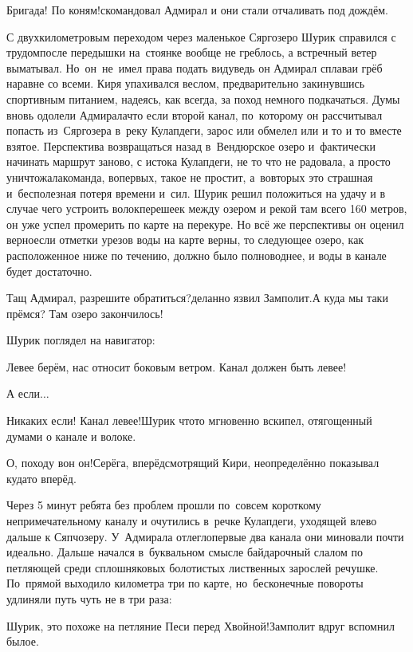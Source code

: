 \diagdash Бригада! По коням!\mdash скомандовал Адмирал и они стали отчаливать под дождём.

С двухкилометровым переходом через маленькое Сяргозеро Шурик справился с трудом\mdash после передышки на~стоянке вообще не греблось, а встречный ветер выматывал. Но~он~не~имел права подать виду\mdash ведь он Адмирал сплава\mdash и грёб наравне со всеми. Киря упахивался веслом, предварительно закинувшись спортивным питанием, надеясь, как всегда, за поход немного подкачаться. Думы вновь одолели Адмирала\mdash что если второй канал, по~которому он рассчитывал попасть из~Сяргозера в~реку Кулапдеги, зарос или обмелел или и то и то вместе взятое. Перспектива возвращаться назад в~Вендюрское озеро и~фактически начинать маршрут заново, с истока Кулапдеги, не то что не радовала, а просто уничтожала\mdash команда, во\sdash первых, такое не простит, а~во\sdash вторых это страшная и~бесполезная потеря времени и~сил. Шурик решил положиться на удачу и в случае чего устроить волок\mdash перешеек между озером и рекой там всего 160 метров, он уже успел промерить по карте на перекуре. Но всё же перспективы он оценил верно\mdash если отметки урезов воды на карте верны, то следующее озеро, как расположенное ниже по течению, должно было полноводнее, и воды в канале будет достаточно.

\diagdash Тащ Адмирал, разрешите обратиться?\mdash деланно язвил Замполит.\mdash А куда мы таки прёмся? Там озеро закончилось!

Шурик поглядел на навигатор:

\diagdash Левее берём, нас относит боковым ветром. Канал должен быть левее!

\diagdash А если$\ldots$

\diagdash Никаких если! Канал левее!\mdash Шурик что\sdash то мгновенно вскипел, отягощенный думами о канале и волоке.

\diagdash О, походу вон он!\mdash Серёга, вперёдсмотрящий Кири, неопределённо показывал куда\sdash то вперёд.

Через 5 минут ребята без проблем прошли по~совсем короткому непримечательному каналу и очутились в~речке Кулапдеги, уходящей влево дальше к Сяпчозеру. У~Адмирала отлегло\mdash первые два канала они миновали почти идеально. Дальше начался в~буквальном смысле байдарочный слалом по петляющей среди сплошняковых болотистых лиственных зарослей речушке. По~прямой выходило километра три по карте, но~бесконечные повороты удлиняли путь чуть не в три раза:

\diagdash Шурик, это похоже на петляние Песи перед Хвойной!\mdash Замполит вдруг вспомнил былое.

